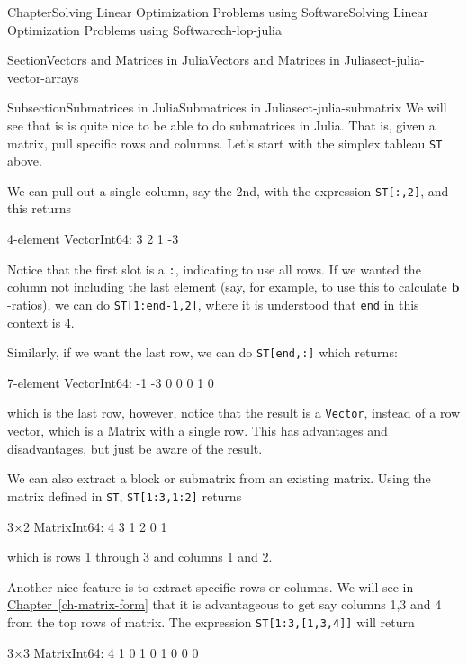 \documentclass[oneside,10pt,]{book}
\newcommand{\xreffont}{\relax}
\newcommand{\mono}[1]{\texttt{#1}}
\numberwithin{equation}{section}
\begin{document}
\begin{chapterptx}{Chapter}{Solving Linear Optimization Problems using Software}{}{Solving Linear Optimization Problems using Software}{}{}{ch-lop-julia}
\begin{sectionptx}{Section}{Vectors and Matrices in Julia}{}{Vectors and Matrices in Julia}{}{}{sect-julia-vector-arrays}
%
\begin{subsectionptx}{Subsection}{Submatrices in Julia}{}{Submatrices in Julia}{}{}{sect-julia-submatrix}
We will see that is is quite nice to be able to do submatrices in Julia. That is, given a matrix, pull specific rows and columns. Let's start with the simplex tableau \mono{ST} above.%
\par
We can pull out a single column, say the 2nd, with the expression \mono{ST[:,2]}, and this returns%
\par
%
\begin{codedisplay}
4-element Vector{Int64}:
  3
  2
  1
 -3
\end{codedisplay}
%
\par
Notice that the first slot is a \mono{:}, indicating to use all rows. If we wanted the column not including the last element (say, for example, to use this to calculate \(\boldsymbol{b}\)-ratios), we can do \mono{ST[1:end-1,2]}, where it is understood that \mono{end} in this context is 4.%
\par
Similarly, if we want the last row, we can do \mono{ST[end,:]} which returns:%
\par
%
\begin{codedisplay}
7-element Vector{Int64}:
 -1
 -3
  0
  0
  0
  1
  0
\end{codedisplay}
%
\par
which is the last row, however, notice that the result is a \mono{Vector}, instead of a row vector, which is a Matrix with a single row. This has advantages and disadvantages, but just be aware of the result.%
\par
We can also extract a block or submatrix from an existing matrix. Using the matrix defined in \mono{ST}, \mono{ST[1:3,1:2]} returns%
\par
%
\begin{codedisplay}
3×2 Matrix{Int64}:
 4  3
 1  2
 0  1
\end{codedisplay}
%
\par
which is rows 1 through 3 and columns 1 and 2.%
\par
Another nice feature is to extract specific rows or columns. We will see in \hyperref[ch-matrix-form]{Chapter~{\xreffont\ref{ch-matrix-form}}} that it is advantageous to get say columns 1,3 and 4 from the top rows of matrix. The expression \mono{ST[1:3,[1,3,4]]} will return%
\par
%
\begin{codedisplay}
3×3 Matrix{Int64}:
 4  1  0
 1  0  1
 0  0  0
\end{codedisplay}

\end{subsectionptx}
\end{sectionptx}
\end{chapterptx}
\end{document}
